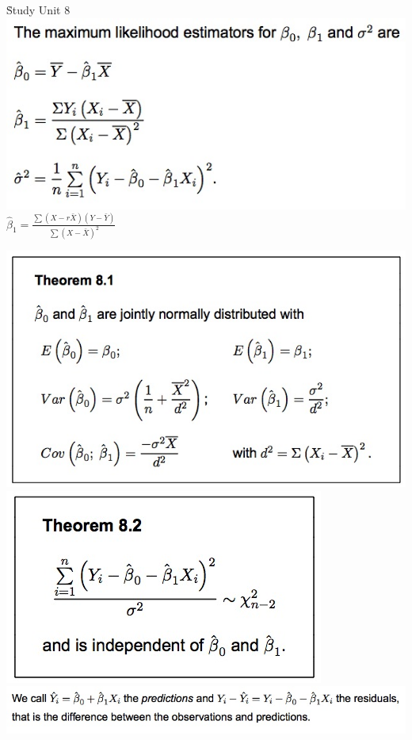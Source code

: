 \documentclass{examnotes}
\begin{document}
\h{Study Unit 8}
\includegraphics[scale=0.5]{./img/81.jpg}
$\hat{\beta}_1=\displaystyle\frac{\sum(X-r\bar{X})(Y-\bar{Y})}{\sum(X-\bar{X})^2}$

\includegraphics[scale=0.4]{./img/t81.jpg}
\includegraphics[scale=0.4]{./img/t82.jpg}
\includegraphics[scale=0.5]{./img/8216.jpg}
\end{document}
